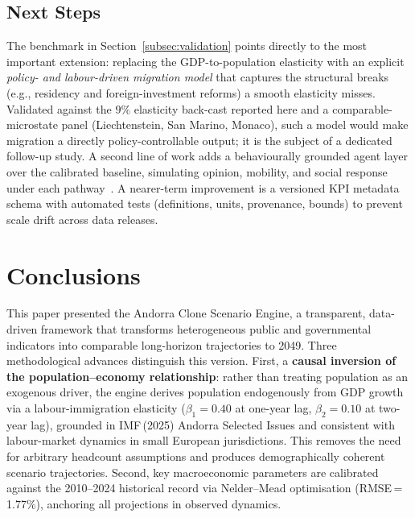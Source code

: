 \documentclass[urbansci,article,submit,pdftex,moreauthors]{Definitions/mdpi}
\begin{document}
\subsection{Next Steps}

The benchmark in Section~\ref{subsec:validation} points directly to the most
important extension: replacing the GDP-to-population elasticity with an explicit
\emph{policy- and labour-driven migration model} that captures the structural breaks
(e.g., residency and foreign-investment reforms) a smooth elasticity misses. Validated
against the $9\%$ elasticity back-cast reported here and a comparable-microstate panel
(Liechtenstein, San Marino, Monaco), such a model would make migration a directly
policy-controllable output; it is the subject of a dedicated follow-up study. A second
line of work adds a behaviourally grounded agent layer over the calibrated baseline,
simulating opinion, mobility, and social response under each
pathway~\cite{adornetto2025generative,garcia2025simulating,carrero2024integrating,li2025hugagent}.
A nearer-term improvement is a versioned KPI metadata schema with automated tests
(definitions, units, provenance, bounds) to prevent scale drift across data releases.

\section{Conclusions}
\label{sec:conclusions}

This paper presented the Andorra Clone Scenario Engine, a transparent,
data-driven framework that transforms heterogeneous public and governmental
indicators into comparable long-horizon trajectories to 2049. Three
methodological advances distinguish this version. First, a
\textbf{causal inversion of the population--economy relationship}: rather than
treating population as an exogenous driver, the engine derives population
endogenously from GDP growth via a labour-immigration elasticity
($\beta_1=0.40$ at one-year lag, $\beta_2=0.10$ at two-year lag), grounded in
IMF\,(2025) Andorra Selected Issues and consistent with labour-market dynamics
in small European jurisdictions. This removes the need for arbitrary headcount
assumptions and produces demographically coherent scenario trajectories.
Second, key macroeconomic parameters are calibrated against the 2010--2024
historical record via Nelder--Mead optimisation (RMSE\,=\,1.77\%), anchoring
all projections in observed dynamics.
\end{document}

